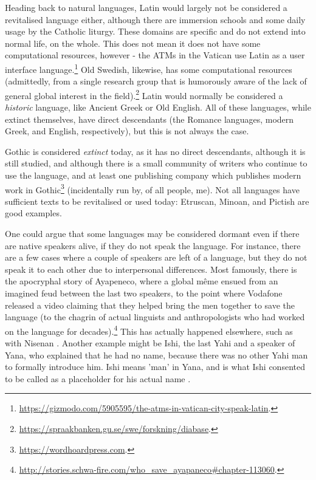 Heading back to natural languages, Latin would largely not be considered a revitalised language either, although there are immersion schools and some daily usage by the Catholic liturgy. These domains are specific and do not extend into normal life, on the whole. This does not mean it does not have some computational resources, however - the ATMs in the Vatican use Latin as a user interface language.\footnote{\href{https://gizmodo.com/5905595/the-atms-in-vatican-city-speak-latin}{https://gizmodo.com/5905595/the-atms-in-vatican-city-speak-latin}. } Old Swedish, likewise, has some computational resources (admittedly, from a single research group that is humorously aware of the lack of general global interest in the field).\footnote{\href{https://spraakbanken.gu.se/swe/forskning/diabase}{https://spraakbanken.gu.se/swe/forskning/diabase}. } Latin would normally be considered a \textit{historic} language, like Ancient Greek or Old English. All of these languages, while extinct themselves, have direct descendants (the Romance languages, modern Greek, and English, respectively), but this is not always the case.

Gothic is considered \textit{extinct} today, as it has no direct descendants, although it is still studied, and although there is a small community of writers who continue to use the language, and at least one publishing company which publishes modern work in Gothic\footnote{\href{https://wordhoardpress.com}{https://wordhoardpress.com}. } (incidentally run by, of all people, me). Not all languages have sufficient texts to be revitalised or used today: Etruscan, Minoan, and Pictish are good examples.

One could argue that some languages may be considered dormant even if there are native speakers alive, if they do not speak the language. For instance, there are a few cases where a couple of speakers are left of a language, but they do not speak it to each other due to interpersonal differences. Most famously, there is the apocryphal story of Ayapeneco, where a global m\^eme ensued from an imagined feud between the last two speakers, to the point where Vodafone released a video claiming that they helped bring the men together to save the language (to the chagrin of actual linguists and anthropologists who had worked on the language for decades).\footnote{\href{http://stories.schwa-fire.com/who_save_ayapaneco\#chapter-113060}{http://stories.schwa-fire.com/who\_save\_ayapaneco\#chapter-113060}. } This has actually happened elsewhere, such as with Nisenan \citep{snyder2004practice}. Another example might be Ishi, the last Yahi and a speaker of Yana, who explained that he had no name, because there was no other Yahi man to formally introduce him. Ishi means 'man' in Yana, and is what Ishi consented to be called as a placeholder for his actual name \citep{kroeber1973ishi}.

